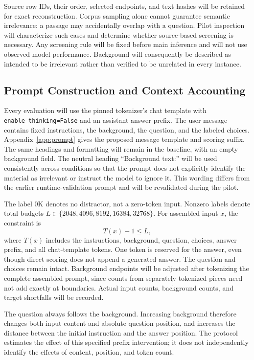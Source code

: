 \documentclass[conference]{IEEEtran}
\begin{document}
Source row IDs, their order, selected endpoints, and text hashes will be retained for exact reconstruction. Corpus sampling alone cannot guarantee semantic irrelevance: a passage may accidentally overlap with a question. Pilot inspection will characterize such cases and determine whether source-based screening is necessary. Any screening rule will be fixed before main inference and will not use observed model performance. Background will consequently be described as intended to be irrelevant rather than verified to be unrelated in every instance.

\subsection{Prompt Construction and Context Accounting}
Every evaluation will use the pinned tokenizer's chat template with \texttt{enable\_thinking=False} and an assistant answer prefix. The user message contains fixed instructions, the background, the question, and the labeled choices. Appendix~\ref{app:prompt} gives the proposed message template and scoring suffix. The same headings and formatting will remain in the baseline, with an empty background field. The neutral heading ``Background text:'' will be used consistently across conditions so that the prompt does not explicitly identify the material as irrelevant or instruct the model to ignore it. This wording differs from the earlier runtime-validation prompt and will be revalidated during the pilot.

The label 0K denotes no distractor, not a zero-token input. Nonzero labels denote total budgets $L\in\{2048,4096,8192,16384,32768\}$. For assembled input $x$, the constraint is
\begin{equation}
T(x)+1\leq L,
\end{equation}
where $T(x)$ includes the instructions, background, question, choices, answer prefix, and all chat-template tokens. One token is reserved for the answer, even though direct scoring does not append a generated answer. The question and choices remain intact. Background endpoints will be adjusted after tokenizing the complete assembled prompt, since counts from separately tokenized pieces need not add exactly at boundaries. Actual input counts, background counts, and target shortfalls will be recorded.

The question always follows the background. Increasing background therefore changes both input content and absolute question position, and increases the distance between the initial instruction and the answer position. The protocol estimates the effect of this specified prefix intervention; it does not independently identify the effects of content, position, and token count.
\end{document}
